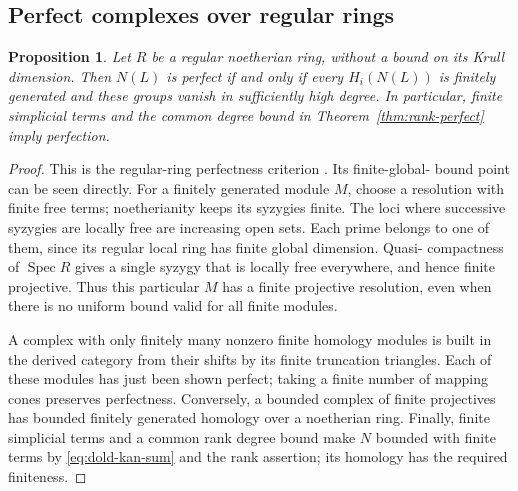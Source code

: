 \documentclass[11pt,a4paper]{article}
\newtheorem{proposition}[theorem]{Proposition}
\theoremstyle{definition}
\newcommand{\Spec}{\operatorname{Spec}}
\begin{document}
\subsection{Perfect complexes over regular rings}
\begin{proposition}\label{prop:regular-perfect}
Let $R$ be a regular noetherian ring, without a bound on its Krull
dimension. Then $N(L)$ is perfect if and only if every $H_i(N(L))$
is finitely generated and these groups vanish in sufficiently high
degree. In particular, finite simplicial terms and the common degree
bound in Theorem~\ref{thm:rank-perfect} imply perfection.
\end{proposition}
\begin{proof}
This is the regular-ring perfectness criterion
\cite[Lemma~15.76.14, Tag~066Z]{StacksRegular}. Its finite-global-
bound point can be seen directly. For a finitely generated module
$M$, choose a resolution with finite free terms; noetherianity keeps
its syzygies finite. The loci where successive syzygies are locally
free are increasing open sets. Each prime belongs to one of them,
since its regular local ring has finite global dimension. Quasi-
compactness of $\Spec R$ gives a single syzygy that is locally free
everywhere, and hence finite projective. Thus this particular $M$
has a finite projective resolution, even when there is no uniform
bound valid for all finite modules.

A complex with only finitely many nonzero finite homology modules
is built in the derived category from their shifts by its finite
truncation triangles. Each of these modules has just been shown
perfect; taking a finite number of mapping cones preserves perfectness.
Conversely, a bounded complex of finite projectives has bounded
finitely generated homology over a noetherian ring. Finally, finite
simplicial terms and a common rank degree bound make $N$ bounded
with finite terms by \eqref{eq:dold-kan-sum} and the rank assertion;
its homology has the required finiteness.
\end{proof}
\end{document}

